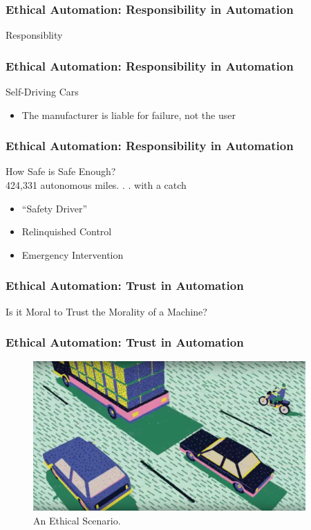 \begin{frame}
  \frametitle{ Ethical Automation: Responsibility in Automation}
  \Large{Responsiblity}
\end{frame}


\begin{frame}
  \frametitle{ Ethical Automation: Responsibility in Automation}
  {\Large Self-Driving Cars}
  \begin{itemize}
  \item The manufacturer is liable for failure, not the user
  \end{itemize}
\end{frame}


\begin{frame}
  \frametitle{ Ethical Automation: Responsibility in Automation}
  {\Large How Safe is Safe Enough?}\\
  424,331 autonomous miles. . . with a catch
  \begin{itemize}
  \item ``Safety Driver''
  \item Relinquished Control
  \item Emergency Intervention
  \end{itemize}
\end{frame}


\begin{frame}
  \frametitle{ Ethical Automation: Trust in Automation}
  \Large{Is it Moral to Trust the Morality of a Machine?}
\end{frame}


\begin{frame}
  \frametitle{ Ethical Automation: Trust in Automation}
  \begin{figure}[bht]
    \centering
    \includegraphics[width=4.1in]{diagrams/image00}
    \caption{An Ethical Scenario.}
    \label{fig:-deg}
  \end{figure}
\end{frame}


